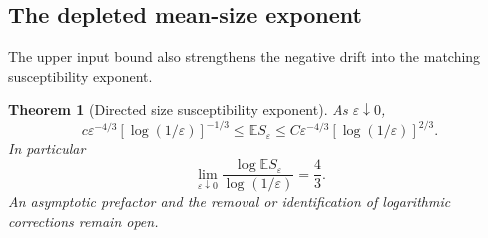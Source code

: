 \documentclass[11pt]{article}
\numberwithin{equation}{section}
\newtheorem{theorem}{Theorem}[section]
\theoremstyle{definition}
\newcommand{\E}{\mathbb E}
\begin{document}
\subsection{The depleted mean-size exponent}\label{sec:lattice-susceptibility}
The upper input bound also strengthens the negative drift into the matching susceptibility exponent.

\begin{theorem}[Directed size susceptibility exponent]\label{thm:lattice-susceptibility}
As $\varepsilon\downarrow0$,
\begin{equation}\label{eq:lattice-susceptibility-logs}
 c\varepsilon^{-4/3}[\log(1/\varepsilon)]^{-1/3}
 \le\E S_\varepsilon
 \le C\varepsilon^{-4/3}[\log(1/\varepsilon)]^{2/3}.
\end{equation}
In particular
\begin{equation}\label{eq:lattice-susceptibility-exponent}
 \lim_{\varepsilon\downarrow0}
 \frac{\log\E S_\varepsilon}{\log(1/\varepsilon)}=\frac43.
\end{equation}
An asymptotic prefactor and the removal or identification of logarithmic corrections remain open.
\end{theorem}
\end{document}

